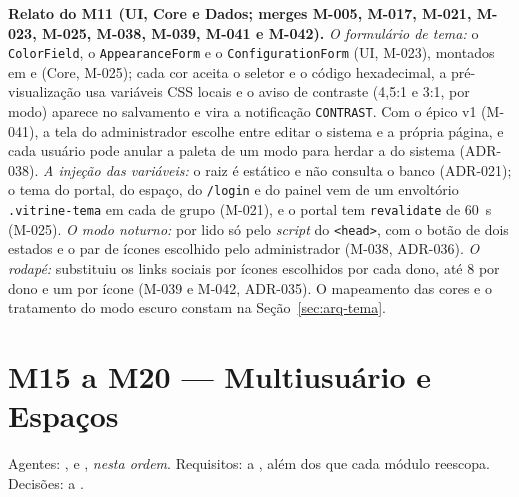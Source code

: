 

\textbf{Relato do M11 (UI, Core e Dados; merges M-005, M-017, M-021, M-023, M-025, M-038, M-039, M-041 e M-042).} \emph{O formulário de tema:} o \texttt{ColorField}, o \texttt{AppearanceForm} e o \texttt{ConfigurationForm} (UI, M-023), montados em  e  (Core, M-025); cada cor aceita o seletor e o código hexadecimal, a pré-visualização usa variáveis CSS locais e o aviso de contraste (4,5:1 e 3:1, por modo) aparece no salvamento e vira a notificação \texttt{CONTRAST}. Com o épico v1 (M-041), a tela do administrador escolhe entre editar o sistema e a própria página, e cada usuário pode anular a paleta de um modo para herdar a do sistema (ADR-038). \emph{A injeção das variáveis:} o  raiz é estático e não consulta o banco (ADR-021); o tema do portal, do espaço, do \texttt{/login} e do painel vem de um envoltório \texttt{.vitrine-tema} em cada  de grupo (M-021), e o portal tem \texttt{revalidate} de 60~s (M-025). \emph{O modo noturno:} por  lido só pelo \emph{script} do \texttt{<head>}, com o botão de dois estados e o par de ícones escolhido pelo administrador (M-038, ADR-036). \emph{O rodapé:} substituiu os links sociais por ícones escolhidos por cada dono, até 8 por dono e um por ícone (M-039 e M-042, ADR-035). O mapeamento das cores e o tratamento do modo escuro constam na Seção~\ref{sec:arq-tema}.

\section{M15 a M20 --- Multiusuário e Espaços}\label{sec:impl-multiusuario}

\noindent{}\quad Agentes: ,  e , \emph{nesta ordem}. Requisitos:  a , além dos que cada módulo reescopa. Decisões:  a .

